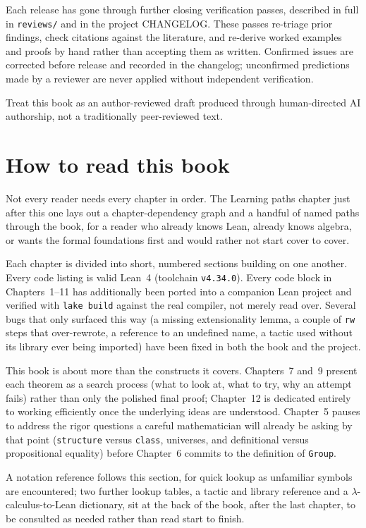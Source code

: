 Each release has gone through further closing verification passes,
described in full in \texttt{reviews/} and in the project CHANGELOG.
These passes re-triage prior findings, check citations against the
literature, and re-derive worked examples and proofs by hand rather than
accepting them as written. Confirmed issues are corrected before release
and recorded in the changelog; unconfirmed predictions made by a
reviewer are never applied without independent verification.

Treat this book as an author-reviewed draft produced through
human-directed AI authorship, not a traditionally peer-reviewed text.

\chapter*{How to read this book}

Not every reader needs every chapter in order. The Learning paths chapter
just after this one lays out a chapter-dependency graph and a handful of
named paths through the book, for a reader who already knows Lean,
already knows algebra, or wants the formal foundations first and would
rather not start cover to cover.

Each chapter is divided into short, numbered sections building on one
another. Every code listing is valid Lean~4 (toolchain
\texttt{v4.34.0}). Every code block in Chapters~1--11 has additionally
been ported into a companion Lean project and verified with
\texttt{lake build} against the real compiler, not merely read over.
Several bugs that only surfaced this way (a missing extensionality
lemma, a couple of \texttt{rw} steps that over-rewrote, a reference to an
undefined name, a tactic used without its library ever being imported)
have been fixed in both the book and the project.

This book is about more than the constructs it covers. Chapters~7 and~9
present each theorem as a search process (what to look at, what to
try, why an attempt fails) rather than only the polished final proof;
Chapter~12 is dedicated entirely to working efficiently once the
underlying ideas are understood. Chapter~5 pauses to address the rigor
questions a careful mathematician will already be asking by that point
(\texttt{structure} versus \texttt{class}, universes, and definitional
versus propositional equality) before Chapter~6 commits to the
definition of \texttt{Group}.

A notation reference follows this section, for quick lookup as unfamiliar
symbols are encountered; two further lookup tables, a tactic and
library reference and a $\lambda$-calculus-to-Lean dictionary, sit at
the back of the book, after the last chapter, to be consulted as needed
rather than read start to finish.

\tableofcontents
